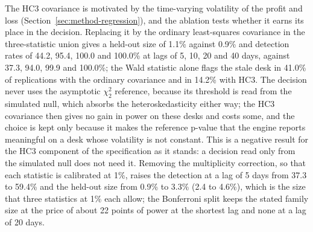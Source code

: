 The HC3 covariance is motivated by the time-varying volatility of the profit and loss (Section~\ref{sec:method-regression}), and the ablation tests whether it earns its place in the decision.
Replacing it by the ordinary least-squares covariance in the three-statistic union gives a held-out size of 1.1\% against 0.9\% and detection rates of 44.2, 95.4, 100.0 and 100.0\% at lags of 5, 10, 20 and 40 days, against 37.3, 94.0, 99.9 and 100.0\%; the Wald statistic alone flags the stale desk in 41.0\% of replications with the ordinary covariance and in 14.2\% with HC3.
The decision never uses the asymptotic $\chi^2_2$ reference, because its threshold is read from the simulated null, which absorbs the heteroskedasticity either way; the HC3 covariance then gives no gain in power on these desks and costs some, and the choice is kept only because it makes the reference p-value that the engine reports meaningful on a desk whose volatility is not constant.
This is a negative result for the HC3 component of the specification as it stands: a decision read only from the simulated null does not need it.
Removing the multiplicity correction, so that each statistic is calibrated at 1\%, raises the detection at a lag of 5 days from 37.3 to 59.4\% and the held-out size from 0.9\% to 3.3\% (2.4 to 4.6\%), which is the size that three statistics at 1\% each allow; the Bonferroni split keeps the stated family size at the price of about 22 points of power at the shortest lag and none at a lag of 20 days.
